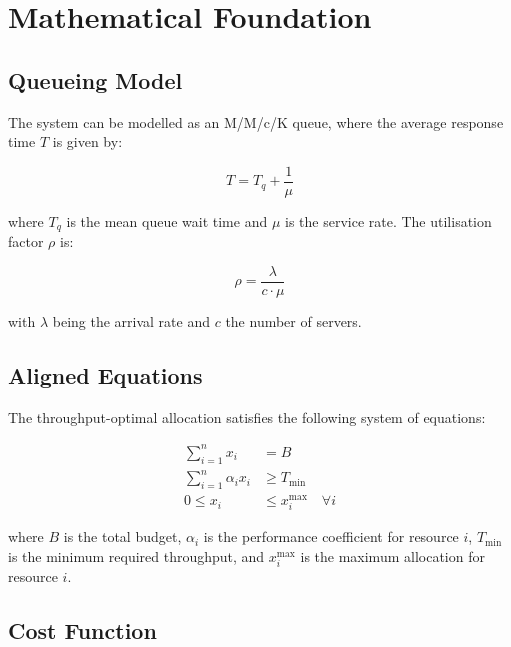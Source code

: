 \documentclass[
    language=english,
    doctype=technical-report,
    institution=none,
    titlestyle=book,
    oneside,
    loadGlossaries,
]{../../omnilatex}
\begin{document}
\chapter{Mathematical Foundation}

\section{Queueing Model}

The system can be modelled as an M/M/c/K queue, where the average
response time $T$ is given by:

\begin{equation}
    T = T_q + \frac{1}{\mu}
    \label{eq:response-time}
\end{equation}

where $T_q$ is the mean queue wait time and $\mu$ is the service rate.
The utilisation factor $\rho$ is:

\begin{equation}
    \rho = \frac{\lambda}{c \cdot \mu}
    \label{eq:utilisation}
\end{equation}

with $\lambda$ being the arrival rate and $c$ the number of servers.

\section{Aligned Equations}

The throughput-optimal allocation satisfies the following system of
equations:

\begin{align}
    \sum_{i=1}^{n} x_i &= B \label{eq:budget-constraint} \\
    \sum_{i=1}^{n} \alpha_i x_i &\geq T_{\min} \label{eq:performance-constraint} \\
    0 \leq x_i &\leq x_i^{\max} \quad \forall i \label{eq:capacity-constraint}
\end{align}

where $B$ is the total budget, $\alpha_i$ is the performance coefficient
for resource $i$, $T_{\min}$ is the minimum required throughput, and
$x_i^{\max}$ is the maximum allocation for resource $i$.

\section{Cost Function}
\end{document}
